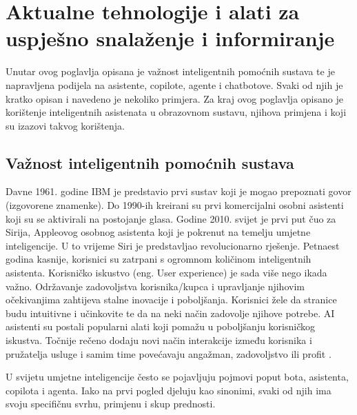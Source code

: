\documentclass[]{foi}
\begin{document}



\chapter{Aktualne tehnologije i alati za uspješno snalaženje i informiranje}
Unutar ovog poglavlja opisana je važnost inteligentnih pomoćnih sustava te je napravljena podijela na asistente, copilote, agente i chatbotove. Svaki od njih je kratko opisan i navedeno je
nekoliko primjera. Za kraj ovog poglavlja opisano je korištenje inteligentnih asistenata u obrazovnom sustavu, njihova primjena i koji su izazovi takvog korištenja.

\section{Važnost inteligentnih pomoćnih sustava}

Davne 1961. godine IBM je predstavio prvi sustav koji je mogao prepoznati govor (izgovorene znamenke). Do 1990-ih kreirani su prvi komercijalni 
osobni asistenti koji su se aktivirali na postojanje glasa. Godine 2010. svijet je prvi put čuo za Sirija, Appleovog osobnog asistenta koji je 
pokrenut na temelju umjetne inteligencije. U to vrijeme Siri je predstavljao revolucionarno rješenje. Petnaest godina kasnije, korisnici su 
zatrpani s ogromnom količinom inteligentnih asistenta. Korisničko iskustvo (eng. User experience) je sada više nego ikada važno. Održavanje zadovoljstva 
korisnika/kupca i upravljanje njihovim očekivanjima zahtijeva stalne inovacije i poboljšanja. Korisnici žele da stranice budu intuitivne i učinkovite
te da na neki način zadovolje njihove potrebe. AI asistenti su postali popularni alati koji pomažu u poboljšanju korisničkog iskustva.
Točnije rečeno dodaju novi način interakcije između korisnika i pružatelja usluge i samim time povećavaju angažman, zadovoljstvo ili profit \cite{buchan2024ai}.

U svijetu umjetne inteligencije često se pojavljuju pojmovi poput bota, asistenta, copilota i agenta. Iako na prvi pogled djeluju kao sinonimi, svaki od njih ima svoju specifičnu svrhu, primjenu i skup prednosti.
\end{document}

